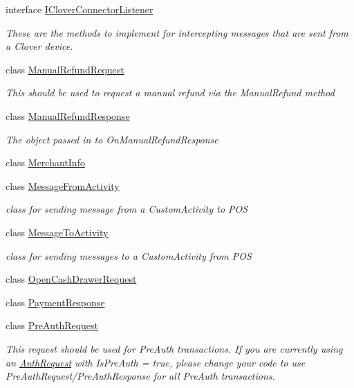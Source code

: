 \begin{DoxyCompactItemize}
interface \hyperlink{interfacecom_1_1clover_1_1remotepay_1_1sdk_1_1_i_clover_connector_listener}{I\+Clover\+Connector\+Listener}
\begin{DoxyCompactList}\small\item\em These are the methods to implement for intercepting messages that are sent from a Clover device. \end{DoxyCompactList}\item 
class \hyperlink{classcom_1_1clover_1_1remotepay_1_1sdk_1_1_manual_refund_request}{Manual\+Refund\+Request}
\begin{DoxyCompactList}\small\item\em This should be used to request a manual refund via the Manual\+Refund method \end{DoxyCompactList}\item 
class \hyperlink{classcom_1_1clover_1_1remotepay_1_1sdk_1_1_manual_refund_response}{Manual\+Refund\+Response}
\begin{DoxyCompactList}\small\item\em The object passed in to On\+Manual\+Refund\+Response \end{DoxyCompactList}\item 
class \hyperlink{classcom_1_1clover_1_1remotepay_1_1sdk_1_1_merchant_info}{Merchant\+Info}
\item 
class \hyperlink{classcom_1_1clover_1_1remotepay_1_1sdk_1_1_message_from_activity}{Message\+From\+Activity}
\begin{DoxyCompactList}\small\item\em class for sending message from a Custom\+Activity to P\+OS \end{DoxyCompactList}\item 
class \hyperlink{classcom_1_1clover_1_1remotepay_1_1sdk_1_1_message_to_activity}{Message\+To\+Activity}
\begin{DoxyCompactList}\small\item\em class for sending messages to a Custom\+Activity from P\+OS \end{DoxyCompactList}\item 
class \hyperlink{classcom_1_1clover_1_1remotepay_1_1sdk_1_1_open_cash_drawer_request}{Open\+Cash\+Drawer\+Request}
\item 
class \hyperlink{classcom_1_1clover_1_1remotepay_1_1sdk_1_1_payment_response}{Payment\+Response}
\item 
class \hyperlink{classcom_1_1clover_1_1remotepay_1_1sdk_1_1_pre_auth_request}{Pre\+Auth\+Request}
\begin{DoxyCompactList}\small\item\em This request should be used for Pre\+Auth transactions. If you are currently using an \hyperlink{classcom_1_1clover_1_1remotepay_1_1sdk_1_1_auth_request}{Auth\+Request} with Is\+Pre\+Auth = true, please change your code to use Pre\+Auth\+Request/\+Pre\+Auth\+Response for all Pre\+Auth transactions. \end{DoxyCompactList}\item 

\end{DoxyCompactItemize}
